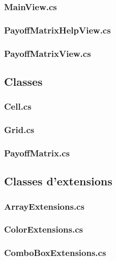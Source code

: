 \documentclass[a4paper, french]{article}
\begin{document}
\subsubsection{MainView.cs}


\subsubsection{PayoffMatrixHelpView.cs}


\subsubsection{PayoffMatrixView.cs}


\pagebreak
\subsection{Classes}
\subsubsection{Cell.cs}


\subsubsection{Grid.cs}


\subsubsection{PayoffMatrix.cs}


\pagebreak
\subsection{Classes d'extensions}
\subsubsection{ArrayExtensions.cs}


\subsubsection{ColorExtensions.cs}


\subsubsection{ComboBoxExtensions.cs}

\end{document}
